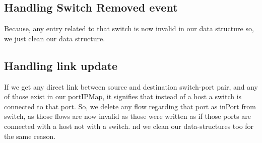 \documentclass{article}
\begin{document}
\subsection{Handling Switch Removed event}

Because, any entry related to that switch is now invalid in our data structure so, we just clean our data structure.

\subsection{Handling link update}

If we get any direct link between source and destination switch-port pair, and any of those exist in our portIPMap, it signifies that instead of a host a switch is connected to that port.
So, we delete any flow regarding that port as inPort from switch, as those flows are now invalid as those were written as if those ports are connected with a host not with a switch.
nd we clean our data-structures too for the same reason.
\printbibliography
\end{document}
